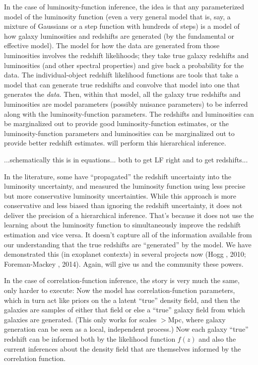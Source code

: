 \documentclass[12pt]{article}
\begin{document}
In the case of luminosity-function inference,
the idea is that any parameterized model of the luminosity function
(even a very general model that is, say, a mixture of Gaussians or a
step function with hundreds of steps) is a model of how galaxy
luminosities and redshifts are generated (by the fundamental or
effective model).
The model for how the data are generated from those luminosities
involves the redshift likelihoods; they take true galaxy redshifts and
luminosities (and other spectral properties) and give back a
probability for the data.
The individual-object redshift likelihood functions are tools that
take a model that can generate true redshifts and convolve that model
into one that generates the \emph{data}.
Then, within that model, all the galaxy true redshifts and
luminosities are model parameters (possibly nuisance parameters) to be
inferred along with the luminosity-function parameters.
The redshifts and luminosities can be marginalized out to provide good
luminosity-function estimates,
or the luminosity-function parameters and luminosities can be marginalized
out to provide better redshift estimates.
 will perform this hierarchical inference.

...schematically this is in equations...  both to get LF right and to get redshifts...

In the literature, some have ``propagated'' the redshift uncertainty
into the luminosity uncertainty, and measured the luminosity function
using less precise but more conservative luminosity uncertainties.
While this approach is more conservative and less biased than ignoring
the redshift uncertainty, it does not deliver the precision of a
hierarchical inference.
That's because it does not use the learning about the luminosity
function to simultaneously improve the redshift estimation and vice
versa.
It doesn't capture all of the information available from our understanding
that the true redshifts are ``generated'' by the model.
We have demonstrated this (in exoplanet contexts) in several projects
now (Hogg \etal, 2010; Foreman-Mackey \etal, 2014).
Again,  will give us and the community these powers.

In the case of correlation-function inference, the story is very much
the same, only harder to execute:
Now the model has correlation-function parameters, which in turn act
like priors on the a latent ``true'' density field, and then the
galaxies are samples of either that field or else a ``true'' galaxy
field from which galaxies are generated.
(This only works for scales $>$Mpc, where galaxy generation can be
seen as a local, independent process.)
Now each galaxy ``true'' redshift can be informed both by the likelihood
function $f(z)$ and also the current inferences about the density field
that are themselves informed by the correlation function.
\end{document}
